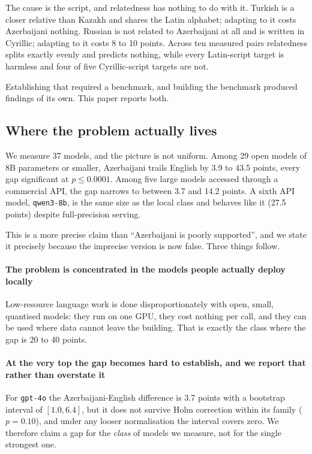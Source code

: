 \documentclass[final]{clv2025}
\begin{document}
The cause is the script, and relatedness has nothing to do with it. Turkish is
a closer relative than Kazakh and shares the Latin alphabet; adapting to it
costs Azerbaijani nothing. Russian is not related to Azerbaijani at all and is
written in Cyrillic; adapting to it costs 8 to 10 points. Across ten measured
pairs relatedness splits exactly evenly and predicts nothing, while every
Latin-script target is harmless and four of five Cyrillic-script targets are
not.

Establishing that required a benchmark, and building the benchmark produced
findings of its own. This paper reports both.

\subsection{Where the problem actually lives}

We measure 37 models, and the picture is not uniform. Among 29 open models of
8B parameters or smaller, Azerbaijani trails English by 3.9 to 43.5 points,
every gap significant at $p \le 0.0001$. Among five large models accessed
through a commercial API, the gap narrows to between 3.7 and 14.2 points. A
sixth API model, \texttt{qwen3-8b}, is the same size as the local class and
behaves like it (27.5 points) despite full-precision serving.

This is a more precise claim than ``Azerbaijani is poorly supported'', and we
state it precisely because the imprecise version is now false. Three things
follow.

\paragraph{The problem is concentrated in the models people actually deploy
locally} Low-resource language work is done disproportionately with open,
small, quantised models: they run on one GPU, they cost nothing per call, and
they can be used where data cannot leave the building. That is exactly the
class where the gap is 20 to 40 points.

\paragraph{At the very top the gap becomes hard to establish, and we report
that rather than overstate it} For \texttt{gpt-4o} the Azerbaijani-English
difference is 3.7 points with a bootstrap interval of $[1.0, 6.4]$, but it does
not survive Holm correction within its family ($p = 0.10$), and under any
looser normalisation the interval covers zero. We therefore claim a gap for the
\emph{class} of models we measure, not for the single strongest one.
\end{document}
